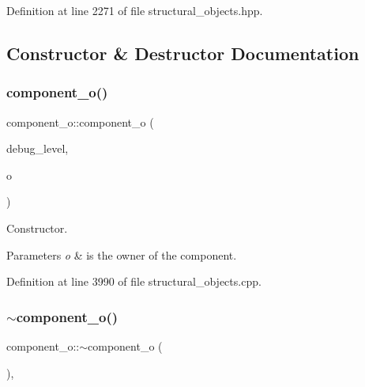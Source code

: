 Definition at line 2271 of file structural\+\_\+objects.\+hpp.



\subsection{Constructor \& Destructor Documentation}
\mbox{\label{classcomponent__o_a2469a8ddc89996074cd2fcbef9e59838}} 
\subsubsection{\texorpdfstring{component\+\_\+o()}{component\_o()}}
{\footnotesize\ttfamily component\+\_\+o\+::component\+\_\+o (\begin{DoxyParamCaption}\item[{int}]{debug\+\_\+level,  }\item[{const \hyperlink{structural__objects_8hpp_a8ea5f8cc50ab8f4c31e2751074ff60b2}{structural\+\_\+object\+Ref}}]{o }\end{DoxyParamCaption})}



Constructor. 


\begin{DoxyParams}{Parameters}
{\em o} & is the owner of the component. \\
\hline
\end{DoxyParams}


Definition at line 3990 of file structural\+\_\+objects.\+cpp.

\mbox{\label{classcomponent__o_aa7c9521caef05636ad1b4d5656135b58}} 
\subsubsection{\texorpdfstring{$\sim$component\+\_\+o()}{~component\_o()}}
{\footnotesize\ttfamily component\+\_\+o\+::$\sim$component\+\_\+o (\begin{DoxyParamCaption}{ }\end{DoxyParamCaption})\hspace{0.3cm}{\ttfamily [override]}, {\ttfamily [default]}}



